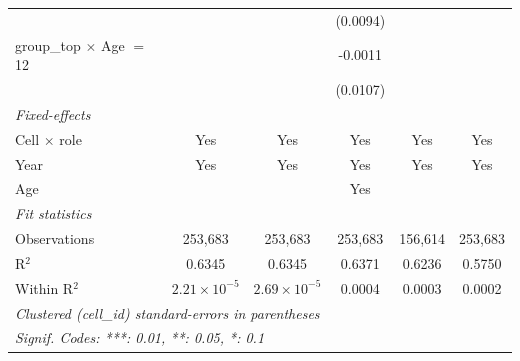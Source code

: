 \begin{table}[htbp]
\begin{tabular}{lccccc}
                                       &                       &                       & (0.0094)        &                &   \\   
      group\_top $\times$ Age $=$ 12   &                       &                       & -0.0011         &                &   \\   
                                       &                       &                       & (0.0107)        &                &   \\   
      \midrule
      \emph{Fixed-effects}\\
      Cell $\times$ role               & Yes                   & Yes                   & Yes             & Yes            & Yes\\  
      Year                             & Yes                   & Yes                   & Yes             & Yes            & Yes\\  
      Age                              &                       &                       & Yes             &                & \\  
      \midrule
      \emph{Fit statistics}\\
      Observations                     & 253,683               & 253,683               & 253,683         & 156,614        & 253,683\\  
      R$^2$                            & 0.6345                & 0.6345                & 0.6371          & 0.6236         & 0.5750\\  
      Within R$^2$                     & $2.21\times 10^{-5}$  & $2.69\times 10^{-5}$  & 0.0004          & 0.0003         & 0.0002\\  
      \midrule \midrule
      \multicolumn{6}{l}{\emph{Clustered (cell\_id) standard-errors in parentheses}}\\
      \multicolumn{6}{l}{\emph{Signif. Codes: ***: 0.01, **: 0.05, *: 0.1}}\\
   \end{tabular}
\end{table}


